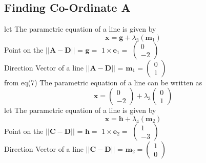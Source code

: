 \documentclass[journal,10pt,twocolumn]{article}
\let\vec\mathbf
\newcommand{\myvec}[1]{\ensuremath{\begin{pmatrix}#1\end{pmatrix}}}
\begin{document}
\begin{flushleft}
\subsection{Finding Co-Ordinate A}
let The parametric equation of a line is given by
\begin{equation}
 \boldsymbol{x} = \vec{g}+\lambda_3(\vec{m}_1)   
\end{equation}
Point on the $||\vec{A-D}||$ = 
\begin{math}
\vec{g} =
\end{math}
\begin{math}
1 \times \vec{e}_1 =
\end{math}
\begin{math}
\myvec{0 \\ -2}
\end{math}
\vspace{0.3cm}\\
Direction Vector of a line  $||\vec{A-D}||$ = 
\begin{math}
\vec{m}_1 = \myvec{0 \\ 1}
\end{math}
\vspace{0.3cm}\\
from eq(7) The parametric equation of a line can be written as
\begin{equation}
     \boldsymbol{x} = \myvec{0 \\ -2} + \lambda_3\myvec{0 \\ 1}
\end{equation}
let The parametric equation of a line is given by
\begin{equation}
 \boldsymbol{x} = \vec{h}+\lambda_4(\vec{m}_2)   
\end{equation}
Point on the $||\vec{C-D}||$ = 
\begin{math}
\vec{h} =
\end{math}
\begin{math}
1 \times \vec{e}_2 =
\end{math}
\begin{math}
\myvec{1 \\ -3}
\end{math}
\vspace{0.3cm}\\
Direction Vector of a line  $||\vec{C-D}||$ = 
\begin{math}
\vec{m}_2 = \myvec{1 \\ 0}
\end{math}
\vspace{0.3cm}\\

\end{flushleft}
\end{document}
